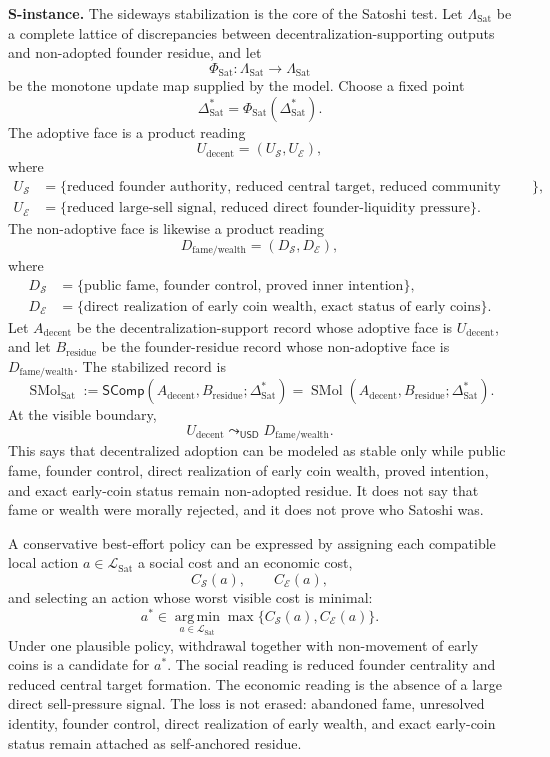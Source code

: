 \documentclass[11pt]{article}
\newcommand{\USD}{\mathsf{USD}}
\newcommand{\defeq}{\mathrel{:=}}
\newcommand{\uconn}{\mathrel{\leadsto_{\USD}}}
\newcommand{\SComp}{\mathsf{SComp}}
\theoremstyle{definition}
\theoremstyle{plain}
\begin{document}
\textbf{S-instance.}  The sideways stabilization is the core of the Satoshi
test.  Let $\Lambda_{\mathrm{Sat}}$ be a complete lattice of discrepancies
between decentralization-supporting outputs and non-adopted founder
residue, and let
\[
  \Phi_{\mathrm{Sat}}:
  \Lambda_{\mathrm{Sat}}\to\Lambda_{\mathrm{Sat}}
\]
be the monotone update map supplied by the model.  Choose a fixed point
\[
  \Delta_{\mathrm{Sat}}^*
  =
  \Phi_{\mathrm{Sat}}(\Delta_{\mathrm{Sat}}^*).
\]
The adoptive face is a product reading
\[
  U_{\mathrm{decent}}
  =
  (U_{\mathcal S},U_{\mathcal E}),
\]
where
\[
\begin{aligned}
  U_{\mathcal S}
  &=
  \{\text{reduced founder authority, reduced central target,
    reduced community dependence}\},\\
  U_{\mathcal E}
  &=
  \{\text{reduced large-sell signal, reduced direct founder-liquidity
    pressure}\}.
\end{aligned}
\]
The non-adoptive face is likewise a product reading
\[
  D_{\mathrm{fame/wealth}}
  =
  (D_{\mathcal S},D_{\mathcal E}),
\]
where
\[
\begin{aligned}
  D_{\mathcal S}
  &=
  \{\text{public fame, founder control, proved inner intention}\},\\
  D_{\mathcal E}
  &=
  \{\text{direct realization of early coin wealth, exact status of
    early coins}\}.
\end{aligned}
\]
Let $A_{\mathrm{decent}}$ be the decentralization-support record whose
adoptive face is $U_{\mathrm{decent}}$, and let
$B_{\mathrm{residue}}$ be the founder-residue record whose non-adoptive
face is $D_{\mathrm{fame/wealth}}$.
The stabilized record is
\[
  \operatorname{SMol}_{\mathrm{Sat}}
  \defeq
  \SComp(A_{\mathrm{decent}},B_{\mathrm{residue}};
   \Delta_{\mathrm{Sat}}^*)
  =
  \operatorname{SMol}
  (A_{\mathrm{decent}},B_{\mathrm{residue}};
   \Delta_{\mathrm{Sat}}^*).
\]
At the visible boundary,
\[
  U_{\mathrm{decent}}
  \uconn
  D_{\mathrm{fame/wealth}}.
\]
This says that decentralized adoption can be modeled as stable only while
public fame, founder control, direct realization of early coin wealth,
proved intention, and exact early-coin status remain non-adopted residue.
It does not say that fame or wealth were morally rejected, and it does
not prove who Satoshi was.

A conservative best-effort policy can be expressed by assigning each
compatible local action $a\in\mathcal L_{\mathrm{Sat}}$ a social cost and
an economic cost,
\[
  C_{\mathcal S}(a),
  \qquad
  C_{\mathcal E}(a),
\]
and selecting an action whose worst visible cost is minimal:
\[
  a^*
  \in
  \operatorname*{arg\,min}_{a\in\mathcal L_{\mathrm{Sat}}}
  \max\{C_{\mathcal S}(a),C_{\mathcal E}(a)\}.
\]
Under one plausible policy, withdrawal together with non-movement of early
coins is a candidate for $a^*$.  The social reading is reduced founder
centrality and reduced central target formation.  The economic reading is
the absence of a large direct sell-pressure signal.  The loss is not
erased: abandoned fame, unresolved identity, founder control, direct
realization of early wealth, and exact early-coin status remain attached
as self-anchored residue.
\end{document}
